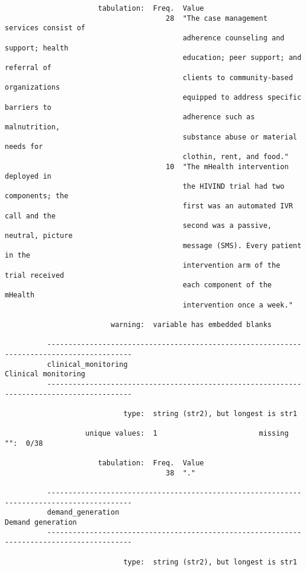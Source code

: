 \documentclass{article}
\begin{document}
\begin{verbatim}
                      tabulation:  Freq.  Value
                                      28  "The case management services consist of
                                          adherence counseling and support; health
                                          education; peer support; and referral of
                                          clients to community-based organizations
                                          equipped to address specific barriers to
                                          adherence such as malnutrition,
                                          substance abuse or material needs for
                                          clothin, rent, and food."
                                      10  "The mHealth intervention deployed in
                                          the HIVIND trial had two components; the
                                          first was an automated IVR call and the
                                          second was a passive, neutral, picture
                                          message (SMS). Every patient in the
                                          intervention arm of the trial received
                                          each component of the mHealth
                                          intervention once a week."
          
                         warning:  variable has embedded blanks
          
          ------------------------------------------------------------------------------------------
          clinical_monitoring                                                    Clinical monitoring
          ------------------------------------------------------------------------------------------
          
                            type:  string (str2), but longest is str1
          
                   unique values:  1                        missing "":  0/38
          
                      tabulation:  Freq.  Value
                                      38  "."
          
          ------------------------------------------------------------------------------------------
          demand_generation                                                        Demand generation
          ------------------------------------------------------------------------------------------
          
                            type:  string (str2), but longest is str1
          

\end{verbatim}
\end{document}
